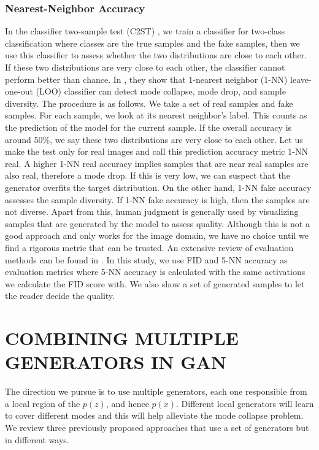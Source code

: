 \documentclass[a4paper,onesided,12pt]{report}
\begin{document}
\subsection{Nearest-Neighbor Accuracy}
\label{subsec:nn}
In the classifier two-sample test (C2ST) \cite{lopez2016revisiting}, we train a classifier for two-class classification where classes are the true samples and the fake samples, then we use this classifier to assess whether the two distributions are close to each other. If these two distributions are very close to each other, the classifier cannot perform better than chance. In \cite{xu2018empirical}, they show that 1-nearest neighbor (1-NN) leave-one-out (LOO) classifier can detect mode collapse, mode drop, and sample diversity. The procedure is as follows. We take a set of real samples and fake samples. For each sample, we look at its nearest neighbor's label. This counts as the prediction of the model for the current sample. If the overall accuracy is around 50\%, we say these two distributions are very close to each other. Let us make the test only for real images and call this prediction accuracy metric 1-NN real. A higher 1-NN real accuracy implies samples that are near real samples are also real, therefore a mode drop. If this is very low, we can suspect that the generator overfits the target distribution. On the other hand, 1-NN fake accuracy assesses the sample diversity. If 1-NN fake accuracy is high, then the samples are not diverse. 
Apart from this, human judgment is generally used by visualizing samples that are generated by the model to assess quality. Although this is not a good approach and only works for the image domain, we have no choice until we find a rigorous metric that can be trusted. An extensive review of evaluation methods can be found in \cite{borji2019pros}. In this study, we use FID and 5-NN accuracy as evaluation metrics where 5-NN accuracy is calculated with the same activations we calculate the FID score with. We also show a set of generated samples to let the reader decide the quality.


\chapter{COMBINING MULTIPLE GENERATORS IN GAN}
\label{chapter:multiple_gan}

The direction we pursue is to use multiple generators, each one responsible from a local region of the $p(z)$, and hence $p(x)$. Different local generators will learn to cover different modes and this will help alleviate the mode collapse problem. We review three previously proposed approaches that use a set of generators but in different ways.
\end{document}
